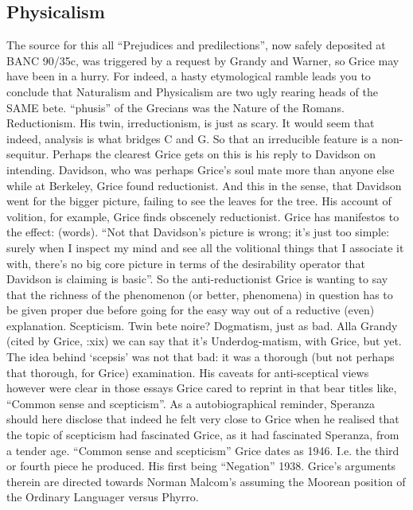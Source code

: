 \documentclass[10pt,titlepage]{book}
\begin{document}
\subsection{Physicalism}

The  source for this all “Prejudices and predilections”, now 
safely deposited at BANC  90/35c, was triggered by a request by Grandy and 
Warner, so Grice may have been  in a hurry. For indeed, a hasty etymological 
ramble leads you to conclude that  Naturalism and Physicalism are two ugly 
rearing heads of the SAME bete. “phusis”  of the Grecians was the Nature of 
the Romans.   
Reductionism. His  twin, irreductionism, is just as scary. It would seem 
that indeed, analysis is  what bridges C and G. So that an irreducible feature 
is a non-sequitur.  Perhaps the clearest Grice gets on this  is his reply 
to Davidson on intending. Davidson, who was perhaps Grice’s soul  mate more 
than anyone else while at Berkeley, Grice found reductionist. And this  in 
the sense, that Davidson went for the bigger picture, failing to see the  
leaves for the tree. His account of volition, for example, Grice finds obscenely 
 reductionist. Grice has manifestos to the effect: (words). “Not that 
Davidson’s  picture is wrong; it’s just too simple: surely when I inspect my 
mind and see  all the volitional things that I associate it with, there’s no 
big core picture  in terms of the desirability operator that Davidson is 
claiming is basic”. So  the anti-reductionist Grice is wanting to say that the 
richness of the  phenomenon (or better,  phenomena)  in question has to be 
given proper due before going for the easy way out of a  reductive (even) 
explanation. 
Scepticism. Twin  bete noire? Dogmatism, just as bad. Alla Grandy (cited by 
Grice, \cite{grice89}:xix) we can  say that it’s Underdog-matism, with Grice, but yet. 
The idea behind ‘scepsis’  was not that bad: it was a thorough (but not 
perhaps that thorough, for Grice)  examination. His caveats for anti-sceptical 
views however were clear in those  essays Grice cared to reprint in \cite{grice89} 
that bear titles like, “Common sense and  scepticism”. As a autobiographical 
reminder, Speranza should here disclose that  indeed he felt very close to 
Grice when he realised that the topic of scepticism  had fascinated Grice, as 
it had fascinated Speranza, from a tender age. “Common  sense and scepticism”
 Grice dates as 1946. I.e. the third or fourth piece he  produced. His 
first being “Negation” 1938. Grice’s arguments therein are  directed towards 
Norman Malcom’s assuming the Moorean position of the Ordinary  Languager 
versus Phyrro. 
\end{document}
